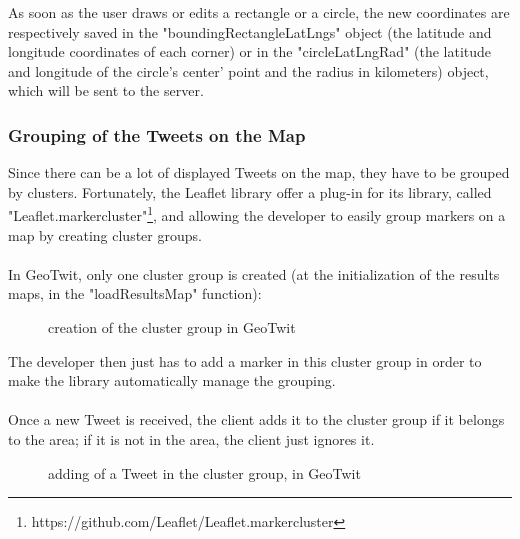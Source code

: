 \documentclass[a4paper,11pt]{report}
\begin{document}
As soon as the user draws or edits a rectangle or a circle, the new coordinates are respectively saved in the "boundingRectangleLatLngs" object (the latitude and longitude coordinates of each corner) or in the "circleLatLngRad" (the latitude and longitude of the circle's center' point and the radius in kilometers) object, which will be sent to the server.
\bigskip

\subsubsection{Grouping of the Tweets on the Map}
Since there can be a lot of displayed Tweets on the map, they have to be grouped by clusters. Fortunately, the Leaflet library offer a plug-in for its library, called "Leaflet.markercluster"\footnote{https://github.com/Leaflet/Leaflet.markercluster}, and allowing the developer to easily group markers on a map by creating cluster groups.\\\\
In GeoTwit, only one cluster group is created (at the initialization of the results maps, in the "loadResultsMap" function):
\begin{figure}[H]
\vspace{-5pt}
\begin{center}
\vspace{-20pt}
\caption{creation of the cluster group in GeoTwit}
\end{center}
\end{figure}

The developer then just has to add a marker in this cluster group in order to make the library automatically manage the grouping.\\\\
Once a new Tweet is received, the client adds it to the cluster group if it belongs to the area; if it is not in the area, the client just ignores it.
\begin{figure}[H]
\vspace{-5pt}
\begin{center}
\vspace{-20pt}
\caption{adding of a Tweet in the cluster group, in GeoTwit}
\end{center}
\end{figure}
\end{document}
